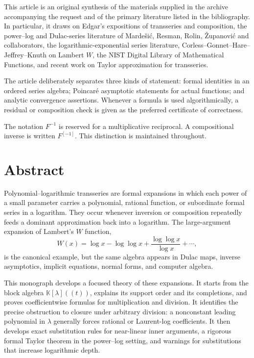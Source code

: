 \documentclass[11pt,openany]{book}
\theoremstyle{definition}
\theoremstyle{plain}
\theoremstyle{remark}
\newcommand{\K}{\mathbb{K}}
\newcommand{\invcomp}{^{[-1]}}
\begin{document}
\thispagestyle{empty}
\vspace*{\fill}
\begin{center}
\begin{minipage}{0.84\textwidth}
\small
This article is an original synthesis of the materials supplied in the archive accompanying the request and of the primary literature listed in the bibliography. In particular, it draws on Edgar's expositions of transseries and composition, the power--log and Dulac-series literature of Marde\v{s}i\'c, Resman, Rolin, \v{Z}upanovi\'c and collaborators, the logarithmic-exponential series literature, Corless--Gonnet--Hare--Jeffrey--Knuth on Lambert \(W\), the NIST Digital Library of Mathematical Functions, and recent work on Taylor approximation for transseries.

\medskip
The article deliberately separates three kinds of statement: formal identities in an ordered series algebra; Poincar\'e asymptotic statements for actual functions; and analytic convergence assertions. Whenever a formula is used algorithmically, a residual or composition check is given as the preferred certificate of correctness.

\medskip
The notation \(F^{-1}\) is reserved for a multiplicative reciprocal. A compositional inverse is written \(F\invcomp\). This distinction is maintained throughout.
\end{minipage}
\end{center}
\vspace*{\fill}
\cleardoublepage

\chapter*{Abstract}
Polynomial--logarithmic transseries are formal expansions in which each power of a small parameter carries a polynomial, rational function, or subordinate formal series in a logarithm. They occur whenever inversion or composition repeatedly feeds a dominant approximation back into a logarithm. The large-argument expansion of Lambert's \(W\) function,
\[
 W(x)=\log x-\log\log x+\frac{\log\log x}{\log x}+\cdots,
\]
is the canonical example, but the same algebra appears in Dulac maps, inverse asymptotics, implicit equations, normal forms, and computer algebra.

This monograph develops a focused theory of these expansions. It starts from the block algebra \(\K[\lambda]((t))\), explains its support order and its completions, and proves coefficientwise formulas for multiplication and division. It identifies the precise obstruction to closure under arbitrary division: a nonconstant leading polynomial in \(\lambda\) generally forces rational or Laurent-log coefficients. It then develops exact substitution rules for near-linear inner arguments, a rigorous formal Taylor theorem in the power--log setting, and warnings for substitutions that increase logarithmic depth.
\end{document}
